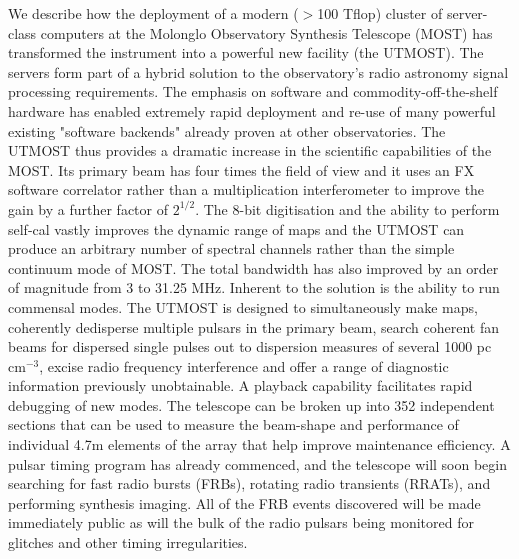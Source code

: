 We describe how the deployment of a modern ($>$100 Tflop) cluster of server-class computers at the Molonglo Observatory Synthesis Telescope (MOST) has transformed the instrument into a powerful new facility (the UTMOST). The servers form part of a hybrid solution to the observatory's radio astronomy signal processing requirements. The emphasis on software and commodity-off-the-shelf hardware has enabled extremely rapid deployment and re-use of many powerful existing "software backends" already proven at other observatories. The UTMOST thus provides a dramatic increase in the scientific capabilities of the MOST. Its primary beam has four times the field of view and it uses an FX software correlator rather than a multiplication interferometer to improve the gain by a further factor of $2^{1/2}$. The 8-bit digitisation and the ability to perform self-cal vastly improves the dynamic range of maps and the UTMOST can produce an arbitrary number of spectral channels rather than the simple continuum mode of MOST. The total bandwidth has also improved by an order of magnitude from 3 to 31.25 MHz. Inherent to the solution is the ability to run commensal modes. The UTMOST is designed to simultaneously make maps, coherently dedisperse multiple pulsars in the primary beam, search coherent fan beams for dispersed single pulses out to dispersion measures of several 1000 pc cm$^{-3}$, excise radio frequency interference and offer a range of diagnostic information previously unobtainable. A playback capability facilitates rapid debugging of new modes. The telescope can be broken up into 352 independent sections that can be used to measure the beam-shape and performance of individual 4.7m elements of the array that help improve maintenance efficiency. A pulsar timing program has already commenced, and the telescope will soon begin searching for fast radio bursts (FRBs), rotating radio transients (RRATs), and performing synthesis imaging. All of the FRB events discovered will be made immediately public as will the bulk of the radio pulsars being monitored for glitches and other timing irregularities. 
